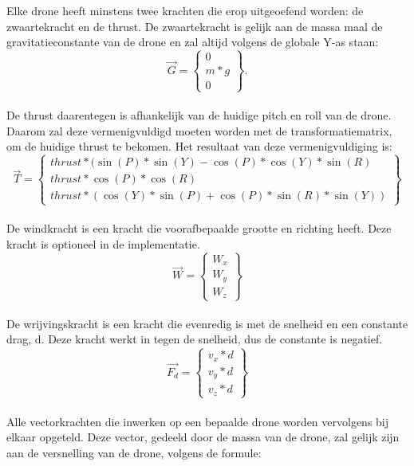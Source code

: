 \\
\\
Elke drone heeft minstens twee krachten die erop uitgeoefend worden: de zwaartekracht en de thrust. De zwaartekracht is gelijk aan de massa maal de gravitatieconstante van de drone en zal altijd volgens de globale Y-as staan: \\
\begin{equation*} 
\vec{G} =
\begin{Bmatrix}
0 \\
m * g \\
0 
\end{Bmatrix}.
\end{equation*} 
\\
De thrust daarentegen is afhankelijk van de huidige pitch en roll van de drone. Daarom zal deze vermenigvuldigd moeten worden met de transformatiematrix, om de huidige thrust te bekomen. Het resultaat van deze vermenigvuldiging is: 
\begin{equation*} 
\vec{T} = 
\begin{Bmatrix}
thrust*(\sin(P)*\sin(Y) - \cos(P)*\cos(Y)*\sin(R)\\ 
thrust*\cos(P)*\cos(R) \\
thrust*(\cos(Y)*\sin(P) + \cos(P)*\sin(R)*\sin(Y))
\end{Bmatrix}
\end{equation*}
\\
De windkracht is een kracht die voorafbepaalde grootte en richting heeft. Deze kracht is optioneel in de implementatie. \\
\begin{equation*}
\vec{W} = 
\begin{Bmatrix}
W_x \\
W_y \\
W_z 
\end{Bmatrix}
\end{equation*}
\\
De wrijvingskracht is een kracht die evenredig is met de snelheid en een constante drag, d. Deze kracht werkt in tegen de snelheid, dus de constante is negatief. \\
\begin{equation*}
\vec{F_d} = 
\begin{Bmatrix}
v_x * d \\
v_y * d \\
v_z * d
\end{Bmatrix}
\end{equation*} \\
Alle vectorkrachten die inwerken op een bepaalde drone worden vervolgens bij elkaar opgeteld. Deze vector, gedeeld door de massa van de drone, zal gelijk zijn aan de versnelling van de drone, volgens de formule: \\
